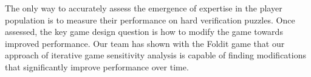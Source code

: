 \documentclass{sig-alternate}
\begin{document}
The only way to accurately assess the emergence of expertise in the
player population is to measure their performance on hard verification
puzzles.  Once assessed, the key game design question is how to modify
the game towards improved performance.  Our team has shown with the
Foldit game that our approach of iterative game sensitivity analysis
is capable of finding modifications that significantly improve
performance over time.
 
 
% 
% 
% 
\end{document}
